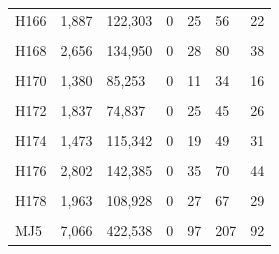 \documentclass[
  a4paper,
  titlepage]{article}
\begin{document}
\begin{longtable}[t]{lllllll}
H166 & 1,887 & 122,303 & 0 & 25 & 56 & 22\\
 
\cellcolor{gray!6}{H167} & \cellcolor{gray!6}{1,446} & \cellcolor{gray!6}{90,028} & \cellcolor{gray!6}{0} & \cellcolor{gray!6}{18} & \cellcolor{gray!6}{44} & \cellcolor{gray!6}{30}\\
 
H168 & 2,656 & 134,950 & 0 & 28 & 80 & 38\\
 
\cellcolor{gray!6}{H169} & \cellcolor{gray!6}{1,900} & \cellcolor{gray!6}{114,655} & \cellcolor{gray!6}{0} & \cellcolor{gray!6}{27} & \cellcolor{gray!6}{44} & \cellcolor{gray!6}{29}\\
 
H170 & 1,380 & 85,253 & 0 & 11 & 34 & 16\\
 
\cellcolor{gray!6}{H171} & \cellcolor{gray!6}{3,061} & \cellcolor{gray!6}{149,327} & \cellcolor{gray!6}{0} & \cellcolor{gray!6}{31} & \cellcolor{gray!6}{93} & \cellcolor{gray!6}{37}\\
 
H172 & 1,837 & 74,837 & 0 & 25 & 45 & 26\\
 
\cellcolor{gray!6}{H173} & \cellcolor{gray!6}{1,855} & \cellcolor{gray!6}{100,547} & \cellcolor{gray!6}{0} & \cellcolor{gray!6}{25} & \cellcolor{gray!6}{48} & \cellcolor{gray!6}{28}\\
 
H174 & 1,473 & 115,342 & 0 & 19 & 49 & 31\\
 
\cellcolor{gray!6}{H175} & \cellcolor{gray!6}{1,373} & \cellcolor{gray!6}{106,568} & \cellcolor{gray!6}{0} & \cellcolor{gray!6}{18} & \cellcolor{gray!6}{38} & \cellcolor{gray!6}{24}\\
 
H176 & 2,802 & 142,385 & 0 & 35 & 70 & 44\\
 
\cellcolor{gray!6}{H177} & \cellcolor{gray!6}{2,225} & \cellcolor{gray!6}{127,242} & \cellcolor{gray!6}{0} & \cellcolor{gray!6}{26} & \cellcolor{gray!6}{64} & \cellcolor{gray!6}{25}\\
 
H178 & 1,963 & 108,928 & 0 & 27 & 67 & 29\\
 
\cellcolor{gray!6}{H179} & \cellcolor{gray!6}{2,323} & \cellcolor{gray!6}{118,105} & \cellcolor{gray!6}{0} & \cellcolor{gray!6}{27} & \cellcolor{gray!6}{55} & \cellcolor{gray!6}{24}\\
 
MJ5 & 7,066 & 422,538 & 0 & 97 & 207 & 92\\*
\end{longtable}
\end{document}
